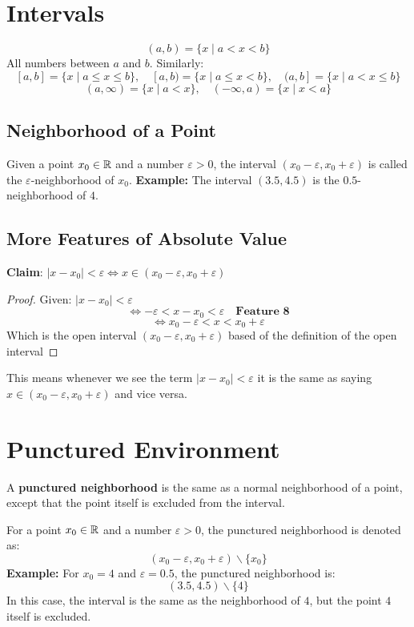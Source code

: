 \section{Intervals}
\[
(a,b) = \{x \mid a < x < b\}
\]
All numbers between $a$ and $b$. Similarly:
\[
[a,b] = \{x \mid a \leq x \leq b\}, \quad [a,b) = \{x \mid a \leq x < b\}, \quad (a,b] = \{x \mid a < x \leq b\}
\]
\[
(a, \infty) = \{x \mid a < x\}, \quad (-\infty, a) = \{x \mid x < a\}
\]

\subsection{Neighborhood of a Point}
Given a point $x_0 \in \mathbb{R}$ and a number $\varepsilon > 0$, the interval $(x_0 - \varepsilon, x_0 + \varepsilon)$ is called the $\varepsilon$-neighborhood of $x_0$.  
\textbf{Example:}  
The interval $(3.5, 4.5)$ is the $0.5$-neighborhood of $4$.


\subsection{More Features of Absolute Value}
\textbf{Claim}: $|x-x_0|<\varepsilon \iff x\in (x_0-\varepsilon,x_0+\varepsilon)$\\
\begin{proof}
    Given: $|x-x_0|<\varepsilon$
    \[ 
        \iff -\varepsilon < x-x_0 <\varepsilon \quad\textbf{Feature 8} 
    \]
    \[
        \iff x_0-\varepsilon < x <x_0+\varepsilon
    \]
    Which is the open interval $(x_0-\varepsilon,x_0+\varepsilon)$ based of the definition of the open interval
\end{proof}
This means whenever we see the term $|x-x_0|<\varepsilon$ it is the same as saying $x\in (x_0-\varepsilon,x_0+\varepsilon)$ and vice versa.\\

\section{Punctured Environment}

A \textbf{punctured neighborhood} is the same as a normal neighborhood of a point, except that the point itself is excluded from the interval.

\noindent For a point \( x_0 \in \mathbb{R} \) and a number \( \varepsilon > 0 \), the punctured neighborhood is denoted as:
\[
(x_0 - \varepsilon, x_0 + \varepsilon) \backslash \{x_0\}
\]
\textbf{Example:}  
For \( x_0 = 4 \) and \( \varepsilon = 0.5 \), the punctured neighborhood is:
\[
(3.5, 4.5) \backslash \{4\}
\]
In this case, the interval is the same as the neighborhood of $4$, but the point $4$ itself is excluded.

